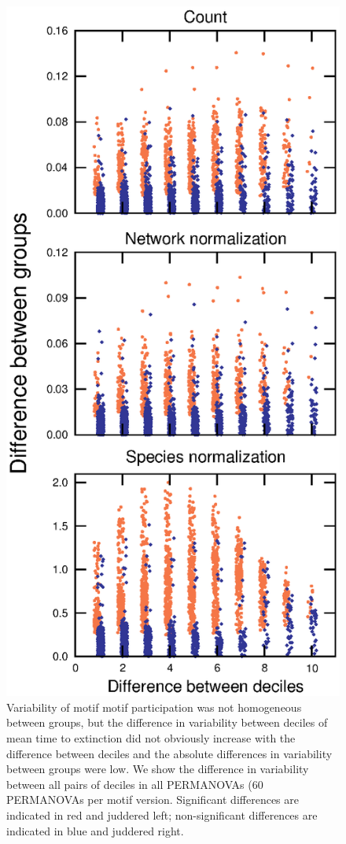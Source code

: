 \documentclass[12pt]{article}
\begin{document}
\begin{spacing}{2.0}
        \begin{figure}[h!]
            \centering
            \includegraphics[height=.75\textheight]{figures/Tukey_differences.eps}
            \caption{Variability of motif motif participation was not homogeneous between groups, but the difference in variability between deciles of mean time to extinction did not obviously increase with the difference between deciles and the absolute differences in variability between groups were low. We show the difference in variability between all pairs of deciles in all PERMANOVAs (60 PERMANOVAs per motif version. Significant differences are indicated in red and juddered left; non-significant differences are indicated in blue and juddered right.}
            \label{fig:betadisper_Tukey}
        \end{figure}



\end{spacing}
\end{document}
